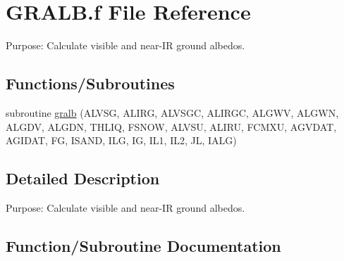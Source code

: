 \hypertarget{GRALB_8f}{}\section{G\+R\+A\+L\+B.\+f File Reference}
\label{GRALB_8f}


Purpose\+: Calculate visible and near-\/\+I\+R ground albedos.  


\subsection*{Functions/\+Subroutines}
\begin{DoxyCompactItemize}
\item 
subroutine \hyperlink{GRALB_8f_a99502ab3789165086e450da1aef1ecd5}{gralb} (A\+L\+V\+S\+G, A\+L\+I\+R\+G, A\+L\+V\+S\+G\+C, A\+L\+I\+R\+G\+C, A\+L\+G\+W\+V, A\+L\+G\+W\+N, A\+L\+G\+D\+V, A\+L\+G\+D\+N, T\+H\+L\+I\+Q, F\+S\+N\+O\+W, A\+L\+V\+S\+U, A\+L\+I\+R\+U, F\+C\+M\+X\+U, A\+G\+V\+D\+A\+T, A\+G\+I\+D\+A\+T, F\+G, I\+S\+A\+N\+D, I\+L\+G, I\+G, I\+L1, I\+L2, J\+L, I\+A\+L\+G)
\end{DoxyCompactItemize}


\subsection{Detailed Description}
Purpose\+: Calculate visible and near-\/\+I\+R ground albedos. 



\subsection{Function/\+Subroutine Documentation}
\hypertarget{GRALB_8f_a99502ab3789165086e450da1aef1ecd5}{}
